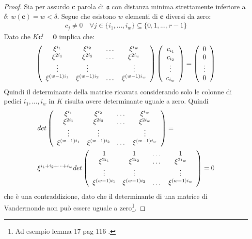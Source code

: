 \begin{proof}
    Sia per assurdo $\mathbf{c}$ parola di $\mathfrak{a}$ con distanza minima strettamente inferiore a $\delta$: $w(\mathbf{c})= w < \delta$. Segue che esistono $w$ elementi di $\mathbf{c}$ diversi da zero: 
    \begin{align*}
       c_{j} \neq 0 \quad \forall j \in \lbrace i_{1}, \dots, i_{w} \rbrace \subseteq \lbrace 0, 1 , \dots, r-1 \rbrace
    \end{align*}
    Dato che $K \mathbf{c}^{t} = \mathbf{0}$ implica che:  
    \begin{align*}
 	\left(
 	\begin{array} {c c c c}
 	\xi^{i_1} & \xi^{i_2} & \dots & \xi^{i_w}   \\
        \xi^{2i_1}  & \xi^{2i_2} & \dots & \xi^{2i_w}   \\
        \vdots &   \vdots  &  & \vdots   \\
        \xi^{(w - 1 )i_1}&\xi^{(w-1)i_2} & \dots & \xi^{(w -1)i_w}         
 	\end{array}
 	\right)
 	\left(
 	\begin{array} {c}
 	c_{i_{1}} \\
 	c_{i_{2}}\\
 	\vdots \\
 	c_{i_{w}}
 	\end{array}
 	\right)
 	=
 	\left(
 	\begin{array} {c}
 	0 \\
 	0\\
 	\vdots \\
 	0
 	\end{array}
 	\right)
     \end{align*}    
    Quindi il determinante della matrice ricavata considerando solo le colonne di pedici $i_{1}, \dots, i_{w}$ in $K$ risulta avere determinante uguale a zero. Quindi 
    \begin{align*}
       & det
 	\left(
 	\begin{array} {c c c c}
 	\xi^{i_1} & \xi^{i_2} & \dots & \xi^{i_w}   \\
        \xi^{2i_1}  & \xi^{2i_2} & \dots & \xi^{2i_w}   \\
        \vdots &   \vdots  &  & \vdots   \\
        \xi^{(w - 1 )i_1}&\xi^{(w-1)i_2} & \dots & \xi^{(w -1)i_w}         
 	\end{array}
 	\right)
 	= \\
 	& \xi^{i_1 + i_2 + \dots + i_w }
 	det
 	\left(
 	\begin{array} {c c c c}
 	1 &  1 & \dots & 1   \\
        \xi^{2i_1} & \xi^{2i_2} & \dots & \xi^{2i_w}   \\
        \vdots &  \vdots  &  & \vdots   \\
        \xi^{(w - 1 )i_1}& \xi^{(w-1)i_2} & \dots & \xi^{(w-1)i_w}         
 	\end{array}
 	\right) 
 	= 0
    \end{align*}
    che è una contraddizione, dato che il determinante di una matrice di Vandermonde non può essere uguale a zero\footnote{Ad esempio lemma $17$ pag $116$ \cite{sloane}.}.
\end{proof}
